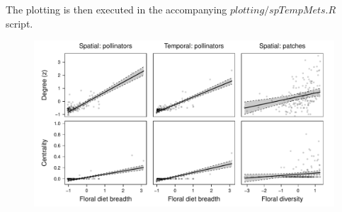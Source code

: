 \documentclass{article}\usepackage[]{graphicx}\usepackage[]{color}
\begin{document}
The plotting is then executed in the accompanying
$plotting/spTempMets.R$ script.

\clearpage

\begin{figure}[h!]
  \centering
  \includegraphics[width=1\textwidth]{figure/all_sig_drop_li_htFALSE.pdf}
  \label{fig:connectivity}
\end{figure}
\clearpage
\end{document}

